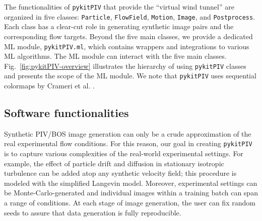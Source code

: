 \documentclass[a4paper,fleqn]{cas-dc}
\begin{document}
The functionalities of \texttt{pykitPIV} that provide the ``virtual wind tunnel'' are organized in five classes: \texttt{Particle}, \texttt{FlowField}, \texttt{Motion}, \texttt{Image}, and \texttt{Postprocess}. Each class has a clear-cut role in generating synthetic image pairs and the corresponding flow targets. Beyond the five main classes, we provide a dedicated ML module, \texttt{pykitPIV.ml}, which contains wrappers and integrations to various ML algorithms. The ML module can interact with the five main classes. Fig.~\ref{fig:pykitPIV-overview} illustrates the hierarchy of using \texttt{pykitPIV} classes and presents the scope of the ML module. We note that \texttt{pykitPIV} uses sequential colormaps by Crameri et al. \cite{crameri2020misuse}.

\subsection{Software functionalities}

Synthetic PIV/BOS image generation can only be a crude approximation of the real experimental flow conditions. For this reason, our goal in creating \texttt{pykitPIV} is to capture various complexities of the real-world experimental settings. For example, the effect of particle drift and diffusion in stationary isotropic turbulence can be added atop any synthetic velocity field; this procedure is modeled with the simplified Langevin model. Moreover, experimental settings can be Monte-Carlo-generated and individual images within a training batch can span a range of conditions. At each stage of image generation, the user can fix random seeds to assure that data generation is fully reproducible. 
\end{document}
